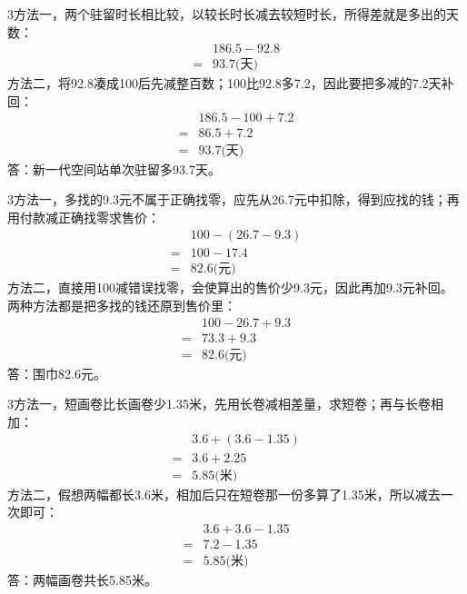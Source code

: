 \documentclass[multi=snippet,border={5bp 20bp 5bp 5bp}]{standalone}
\newenvironment{snippet}[3]{\begin{minipage}{#1bp}\color{answerred}\fontsize{#2}{#3}\selectfont\raggedright}{\end{minipage}}
\begin{document}
\begin{snippet}{505}{11.5}{14}\begin{multicols}{3}\raggedcolumns 方法一，两个驻留时长相比较，以较长时长减去较短时长，所得差就是多出的天数：\[\begin{aligned}&186.5-92.8\\={}&93.7\text{(天)}\end{aligned}\]方法二，将92.8凑成100后先减整百数；100比92.8多7.2，因此要把多减的7.2天补回：\[\begin{aligned}&186.5-100+7.2\\={}&86.5+7.2\\={}&93.7\text{(天)}\end{aligned}\]答：新一代空间站单次驻留多93.7天。\end{multicols}\end{snippet}
\begin{snippet}{505}{11.5}{14}\begin{multicols}{3}\raggedcolumns 方法一，多找的9.3元不属于正确找零，应先从26.7元中扣除，得到应找的钱；再用付款减正确找零求售价：\[\begin{aligned}&100-(26.7-9.3)\\={}&100-17.4\\={}&82.6\text{(元)}\end{aligned}\]方法二，直接用100减错误找零，会使算出的售价少9.3元，因此再加9.3元补回。两种方法都是把多找的钱还原到售价里：\[\begin{aligned}&100-26.7+9.3\\={}&73.3+9.3\\={}&82.6\text{(元)}\end{aligned}\]答：围巾82.6元。\end{multicols}\end{snippet}
\begin{snippet}{505}{11.5}{14}\begin{multicols}{3}\raggedcolumns 方法一，短画卷比长画卷少1.35米，先用长卷减相差量，求短卷；再与长卷相加：\[\begin{aligned}&3.6+(3.6-1.35)\\={}&3.6+2.25\\={}&5.85\text{(米)}\end{aligned}\]方法二，假想两幅都长3.6米，相加后只在短卷那一份多算了1.35米，所以减去一次即可：\[\begin{aligned}&3.6+3.6-1.35\\={}&7.2-1.35\\={}&5.85\text{(米)}\end{aligned}\]答：两幅画卷共长5.85米。\end{multicols}\end{snippet}
\end{document}
